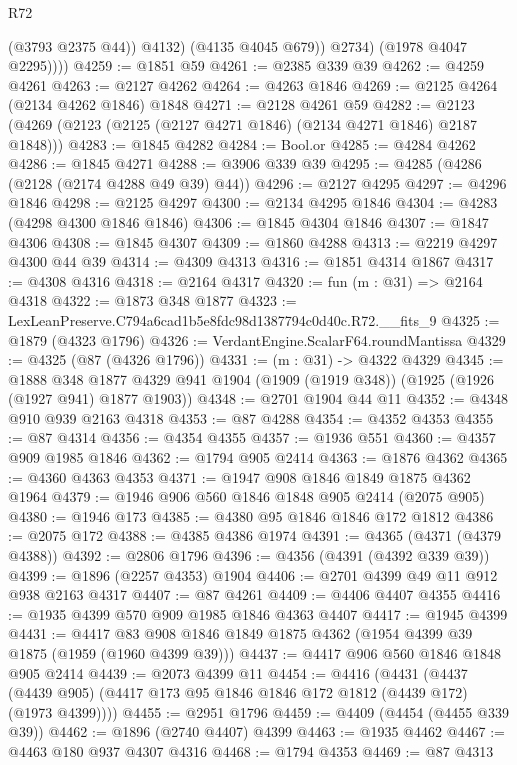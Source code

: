 \begin{lexlean}{R72}
\begin{coremodule}
                  (@3793 @2375 @44))
                @4132)
              (@4135 @4045 @679))
            @2734)
          (@1978 @4047 @2295))))
@4259 := @1851 @59
@4261 := @2385 @339 @39
@4262 := @4259 @4261
@4263 := @2127 @4262
@4264 := @4263 @1846
@4269 := @2125 @4264 (@2134 @4262 @1846) @1848
@4271 := @2128 @4261 @59
@4282 := @2123 (@4269 (@2123 (@2125 (@2127 @4271 @1846) (@2134 @4271 @1846) @2187 @1848)))
@4283 := @1845 @4282
@4284 := Bool.or
@4285 := @4284 @4262
@4286 := @1845 @4271
@4288 := @3906 @339 @39
@4295 := @4285 (@4286 (@2128 (@2174 @4288 @49 @39) @44))
@4296 := @2127 @4295
@4297 := @4296 @1846
@4298 := @2125 @4297
@4300 := @2134 @4295 @1846
@4304 := @4283 (@4298 @4300 @1846 @1846)
@4306 := @1845 @4304 @1846
@4307 := @1847 @4306
@4308 := @1845 @4307
@4309 := @1860 @4288
@4313 := @2219 @4297 @4300 @44 @39
@4314 := @4309 @4313
@4316 := @1851 @4314 @1867
@4317 := @4308 @4316
@4318 := @2164 @4317
@4320 := fun (m : @31) => @2164 @4318
@4322 := @1873 @348 @1877
@4323 := LexLeanPreserve.C794a6cad1b5e8fdc98d1387794c0d40c.R72.__fits_9
@4325 := @1879 (@4323 @1796)
@4326 := VerdantEngine.ScalarF64.roundMantissa
@4329 := @4325 (@87 (@4326 @1796))
@4331 := (m : @31) -> @4322 @4329
@4345 := @1888
    @348
    @1877
    @4329
    @941
    @1904
    (@1909 (@1919 @348))
    (@1925 (@1926 (@1927 @941) @1877 @1903))
@4348 := @2701 @1904 @44 @11
@4352 := @4348 @910 @939 @2163 @4318
@4353 := @87 @4288
@4354 := @4352 @4353
@4355 := @87 @4314
@4356 := @4354 @4355
@4357 := @1936 @551
@4360 := @4357 @909 @1985 @1846
@4362 := @1794 @905 @2414
@4363 := @1876 @4362
@4365 := @4360 @4363 @4353
@4371 := @1947 @908 @1846 @1849 @1875 @4362 @1964
@4379 := @1946 @906 @560 @1846 @1848 @905 @2414 (@2075 @905)
@4380 := @1946 @173
@4385 := @4380 @95 @1846 @1846 @172 @1812
@4386 := @2075 @172
@4388 := @4385 @4386 @1974
@4391 := @4365 (@4371 (@4379 @4388))
@4392 := @2806 @1796
@4396 := @4356 (@4391 (@4392 @339 @39))
@4399 := @1896 (@2257 @4353) @1904
@4406 := @2701 @4399 @49 @11 @912 @938 @2163 @4317
@4407 := @87 @4261
@4409 := @4406 @4407 @4355
@4416 := @1935 @4399 @570 @909 @1985 @1846 @4363 @4407
@4417 := @1945 @4399
@4431 := @4417 @83 @908 @1846 @1849 @1875 @4362 (@1954 @4399 @39 @1875 (@1959 (@1960 @4399 @39)))
@4437 := @4417 @906 @560 @1846 @1848 @905 @2414
@4439 := @2073 @4399 @11
@4454 := @4416
    (@4431 (@4437 (@4439 @905) (@4417 @173 @95 @1846 @1846 @172 @1812 (@4439 @172) (@1973 @4399))))
@4455 := @2951 @1796
@4459 := @4409 (@4454 (@4455 @339 @39))
@4462 := @1896 (@2740 @4407) @4399
@4463 := @1935 @4462
@4467 := @4463 @180 @937 @4307 @4316
@4468 := @1794 @4353
@4469 := @87 @4313

\end{coremodule}
\end{lexlean}
